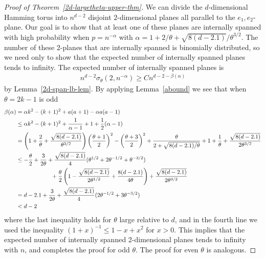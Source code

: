 \begin{proof}[Proof of Theorem~\ref{2d-largetheta-upper-thm}]
We can divide the $d$-dimensional Hamming torus into $n^{d-2}$ disjoint $2$-dimensional planes all parallel to the $e_1,e_2$-plane.  Our goal is to show that at least one of these planes are internally spanned with high probability when $p=n^{-\alpha}$ with $\alpha = 1+2/\theta + \sqrt{8(d-2.1)}/\theta^{3/2}$.  The number of these 2-planes that are internally spanned is binomially distributed, so we need only to show that the expected number of internally spanned planes tends to infinity.  The expected number of internally spanned planes is
\begin{align*}
n^{d-2} \sigma_\theta(2,n^{-\alpha}) \geq C n^{d-2 - \beta(\alpha)}
\end{align*}
by Lemma~\ref{2d-span-lb-lem}.  By applying Lemma~\ref{abound} we see that when $\theta=2k-1$ is odd
\begin{align*}
\beta(\alpha) &= \alpha k^2 - (k+1)^2+a(a+1) - \alpha a(a-1)  \\
&\leq \alpha k^2 - (k+1)^2+ \frac{1}{\alpha - 1} + 1 + \frac{1}{2}(\alpha -1)  \\
&= \left(1 + \frac{2}{\theta}+\frac{\sqrt{8(d-2.1)}}{\theta^{3/2}} \right)\left(\frac{\theta+1}{2}\right)^2 - \left(\frac{\theta+3}{2} \right)^2  + \frac{\theta}{2 + \sqrt{8(d-2.1)/\theta}} + 1+ \frac{1}{\theta}+\frac{\sqrt{8(d-2.1)}}{2\theta^{3/2}} \\
&\leq -\frac{\theta}{2}+\frac{3}{2\theta}+\frac{\sqrt{8(d-2.1)}}{4}(\theta^{1/2} + 2\theta^{-1/2} + \theta^{-3/2}) \\&\qquad\qquad\qquad+ \frac{\theta}{2} \left(1- \frac{\sqrt{8(d-2.1)}}{2\theta^{1/2}}+\frac{8(d-2.1)}{4\theta}\right) +\frac{\sqrt{8(d-2.1)}}{2\theta^{3/2}} \\
& = d-2.1 + \frac{3}{2\theta}+\frac{\sqrt{8(d-2.1)}}{4}(2\theta^{-1/2} + 3\theta^{-3/2})\\
& < d-2
\end{align*}
where the last inequality holds for $\theta$ large relative to $d$, and in the fourth line we used the inequality $(1+x)^{-1} \leq 1- x+x^2$ for $x>0$.  This implies that the expected number of internally spanned 2-dimensional planes tends to infinity with $n$, and completes the proof for odd $\theta$.  The proof for even $\theta$ is analogous.
\end{proof}

